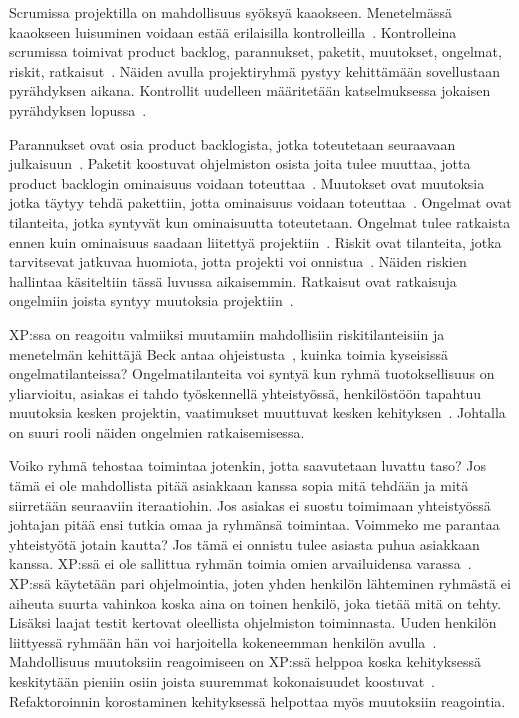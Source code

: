 \documentclass[finnish]{tktltiki2}
\theoremstyle{definition}
\theoremstyle{remark}
\begin{document}
Scrumissa projektilla on mahdollisuus syöksyä kaaokseen. Menetelmässä kaaokseen luisuminen voidaan estää erilaisilla kontrolleilla~\cite{schwaber1995scrum}. Kontrolleina scrumissa toimivat product backlog, parannukset, paketit, muutokset, ongelmat, riskit, ratkaisut~\cite{schwaber1995scrum}. Näiden avulla projektiryhmä pystyy kehittämään sovellustaan pyrähdyksen aikana. Kontrollit uudelleen määritetään katselmuksessa jokaisen pyrähdyksen lopussa~\cite{schwaber1995scrum}.

Parannukset ovat osia product backlogista, jotka toteutetaan seuraavaan julkaisuun~\cite{schwaber1995scrum}. Paketit koostuvat ohjelmiston osista joita tulee muuttaa, jotta product backlogin ominaisuus voidaan toteuttaa~\cite{schwaber1995scrum}. Muutokset ovat muutoksia jotka täytyy tehdä pakettiin, jotta ominaisuus voidaan toteuttaa~\cite{schwaber1995scrum}. Ongelmat ovat tilanteita, jotka syntyvät kun ominaisuutta toteutetaan. Ongelmat tulee ratkaista ennen kuin ominaisuus saadaan liitettyä projektiin~\cite{schwaber1995scrum}. Riskit ovat tilanteita, jotka tarvitsevat jatkuvaa huomiota, jotta projekti voi onnistua~\cite{schwaber1995scrum}. Näiden riskien hallintaa käsiteltiin tässä luvussa aikaisemmin. Ratkaisut ovat ratkaisuja ongelmiin joista syntyy muutoksia projektiin~\cite{schwaber1995scrum}.

XP:ssa on reagoitu valmiiksi muutamiin mahdollisiin riskitilanteisiin ja menetelmän kehittäjä Beck antaa ohjeistusta~\cite{796139}, kuinka toimia kyseisissä ongelmatilanteissa? Ongelmatilanteita voi syntyä kun ryhmä tuotoksellisuus on yliarvioitu, asiakas ei tahdo työskennellä yhteistyössä, henkilöstöön tapahtuu muutoksia kesken projektin, vaatimukset muuttuvat kesken kehityksen~\cite{796139}. Johtalla on suuri rooli näiden ongelmien ratkaisemisessa.

Voiko ryhmä tehostaa toimintaa jotenkin, jotta saavutetaan luvattu taso? Jos tämä ei ole mahdollista pitää asiakkaan kanssa sopia mitä tehdään ja mitä siirretään seuraaviin iteraatiohin. Jos asiakas ei suostu toimimaan yhteistyössä johtajan pitää ensi tutkia omaa ja ryhmänsä toimintaa. Voimmeko me parantaa yhteistyötä jotain kautta? Jos tämä ei onnistu tulee asiasta puhua asiakkaan kanssa. XP:ssä ei ole sallittua ryhmän toimia omien arvailuidensa varassa~\cite{796139}. XP:ssä käytetään pari ohjelmointia, joten yhden henkilön lähteminen ryhmästä ei aiheuta suurta vahinkoa koska aina on toinen henkilö, joka tietää mitä on tehty. Lisäksi laajat testit kertovat oleellista ohjelmiston toiminnasta. Uuden henkilön liittyessä ryhmään hän voi harjoitella kokeneemman henkilön avulla~\cite{796139}. Mahdollisuus muutoksiin reagoimiseen on XP:ssä helppoa koska kehityksessä keskitytään pieniin osiin joista suuremmat kokonaisuudet koostuvat~\cite{796139}. Refaktoroinnin korostaminen kehityksessä helpottaa myös muutoksiin reagointia.   
 
\end{document}
